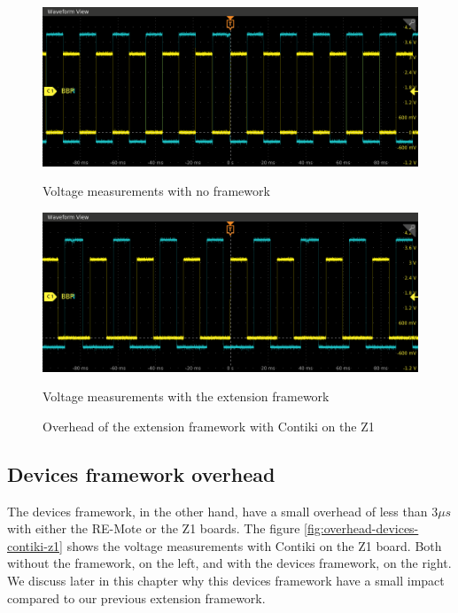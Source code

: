 \begin{figure}[!ht]
  \begin{minipage}{.45\textwidth}
      \centering
      \includegraphics[scale=.25]{assets/reference-value-overhead-contiki-z1.png}
      \caption*{Voltage measurements with no framework}
  \end{minipage}\hfill
  \begin{minipage}{.45\textwidth}        
      \centering
      \includegraphics[scale=.25]{assets/extension-framework-overhead-contiki-z1.png}
      \caption*{Voltage measurements with the extension framework}
  \end{minipage}
  \caption{Overhead of the extension framework with Contiki on the Z1 \label{fig:overhead-extension-contiki-z1}}
\end{figure}

\subsection{Devices framework overhead}

The devices framework, in the other hand, have a small overhead of less than $3\mu s$ with either the RE-Mote or the Z1 boards.
The figure \ref{fig:overhead-devices-contiki-z1} shows the voltage measurements with Contiki on the Z1 board.
Both without the framework, on the left, and with the devices framework, on the right.
We discuss later in this chapter why this devices framework have a small impact compared to our previous extension framework.

